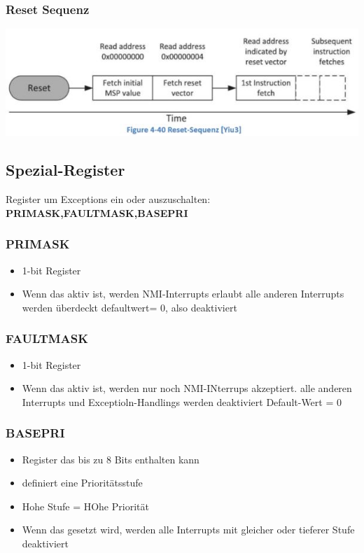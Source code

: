 \subsubsection{Reset Sequenz}
     \includegraphics{images/resetsequenz}
\subsection{Spezial-Register}     
Register um Exceptions ein oder auszuschalten:\\
\textbf{\rightarrow PRIMASK,FAULTMASK,BASEPRI}
\begin{multicols}{2}
    \subsubsection{PRIMASK}
    \begin{itemize}
        \item 1-bit Register
        \item Wenn das aktiv ist, werden NMI-Interrupts erlaubt
        \subitem \rightarrow alle anderen Interrupts werden überdeckt
        \subitem \rightarrow defaultwert= 0, also deaktiviert
    \end{itemize}
    
    \subsubsection{FAULTMASK}
    \begin{itemize}
        \item 1-bit Register
        \item Wenn das aktiv ist, werden nur noch NMI-INterrups akzeptiert.\newline
        alle anderen Interrupts und Exceptioln-Handlings werden deaktiviert
        \subitem \rightarrow Default-Wert = 0
    \end{itemize}
\end{multicols}

\subsubsection{BASEPRI}
\begin{itemize}
    \item Register das bis zu 8 Bits enthalten kann
    \item definiert eine Prioritätsstufe
    \item Hohe Stufe = HOhe Priorität
    \item Wenn das gesetzt wird, werden alle Interrupts mit gleicher oder tieferer Stufe deaktiviert
\end{itemize}

